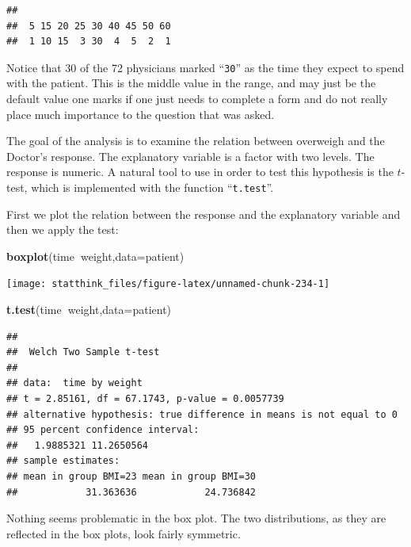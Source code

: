 \documentclass[]{krantz}
\makeatletter
\newenvironment{Shaded}{\begin{snugshade}}{\end{snugshade}}
\newcommand{\DataTypeTok}[1]{\textcolor[rgb]{0.13,0.29,0.53}{#1}}
\newcommand{\KeywordTok}[1]{\textcolor[rgb]{0.13,0.29,0.53}{\textbf{#1}}}
\newcommand{\NormalTok}[1]{#1}
\newcommand{\OperatorTok}[1]{\textcolor[rgb]{0.81,0.36,0.00}{\textbf{#1}}}
\newenvironment{kframe}{%
\medskip{}
\setlength{\fboxsep}{.8em}
 \def\at@end@of@kframe{}%
 \ifinner\ifhmode%
  \def\at@end@of@kframe{\end{minipage}}%
  \begin{minipage}{\columnwidth}%
 \fi\fi%
 \def\FrameCommand##1{\hskip\@totalleftmargin \hskip-\fboxsep
 \colorbox{shadecolor}{##1}\hskip-\fboxsep
     \hskip-\linewidth \hskip-\@totalleftmargin \hskip\columnwidth}%
 \MakeFramed {\advance\hsize-\width
   \@totalleftmargin\z@ \linewidth\hsize
   \@setminipage}}%
 {\par\unskip\endMakeFramed%
 \at@end@of@kframe}
\renewenvironment{Shaded}{\begin{kframe}}{\end{kframe}}
\theoremstyle{definition}
\theoremstyle{definition}
\theoremstyle{definition}
\theoremstyle{remark}
\makeatother
\begin{document}
\begin{verbatim}
## 
##  5 15 20 25 30 40 45 50 60 
##  1 10 15  3 30  4  5  2  1
\end{verbatim}

Notice that 30 of the 72 physicians marked ``\texttt{30}'' as the time they
expect to spend with the patient. This is the middle value in the range,
and may just be the default value one marks if one just needs to
complete a form and do not really place much importance to the question
that was asked.

The goal of the analysis is to examine the relation between overweigh
and the Doctor's response. The explanatory variable is a factor with two
levels. The response is numeric. A natural tool to use in order to test
this hypothesis is the \(t\)-test, which is implemented with the function
``\texttt{t.test}''.

First we plot the relation between the response and the explanatory
variable and then we apply the test:

\begin{Shaded}
\begin{Highlighting}[]
\KeywordTok{boxplot}\NormalTok{(time}\OperatorTok{~}\NormalTok{weight,}\DataTypeTok{data=}\NormalTok{patient)}
\end{Highlighting}
\end{Shaded}

\begin{center}\texttt{[image: statthink\_files/figure-latex/unnamed-chunk-234-1]} \end{center}

\begin{Shaded}
\begin{Highlighting}[]
\KeywordTok{t.test}\NormalTok{(time}\OperatorTok{~}\NormalTok{weight,}\DataTypeTok{data=}\NormalTok{patient)}
\end{Highlighting}
\end{Shaded}

\begin{verbatim}
## 
##  Welch Two Sample t-test
## 
## data:  time by weight
## t = 2.85161, df = 67.1743, p-value = 0.0057739
## alternative hypothesis: true difference in means is not equal to 0
## 95 percent confidence interval:
##   1.9885321 11.2650564
## sample estimates:
## mean in group BMI=23 mean in group BMI=30 
##            31.363636            24.736842
\end{verbatim}

Nothing seems problematic in the box plot.
The two distributions, as they are reflected in the box plots, look
fairly symmetric.
\end{document}
